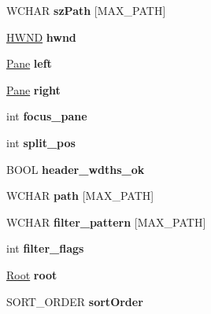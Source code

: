 \begin{DoxyCompactItemize}
W\+C\+H\+AR {\bfseries sz\+Path} \mbox{[}M\+A\+X\+\_\+\+P\+A\+TH\mbox{]}
\item 
\mbox{\label{struct_child_wnd_a444c32ec7347454b65c526836710901a}} 
\hyperlink{interfacevoid}{H\+W\+ND} {\bfseries hwnd}
\item 
\mbox{\label{struct_child_wnd_aa307df38d1d5c09e524b4961b20584c5}} 
\hyperlink{struct_pane}{Pane} {\bfseries left}
\item 
\mbox{\label{struct_child_wnd_ab77c5ad54ad448a44f1acb95eb2747ba}} 
\hyperlink{struct_pane}{Pane} {\bfseries right}
\item 
\mbox{\label{struct_child_wnd_aa809637819408feb62994253eb5d1c93}} 
int {\bfseries focus\+\_\+pane}
\item 
\mbox{\label{struct_child_wnd_a9394d7b181476a467ba306b6db6fbb9f}} 
int {\bfseries split\+\_\+pos}
\item 
\mbox{\label{struct_child_wnd_a696acfa7f9769a60a5082de040c8c574}} 
B\+O\+OL {\bfseries header\+\_\+wdths\+\_\+ok}
\item 
\mbox{\label{struct_child_wnd_afbcb5322841bc2e15d49b1e67a0843c4}} 
W\+C\+H\+AR {\bfseries path} \mbox{[}M\+A\+X\+\_\+\+P\+A\+TH\mbox{]}
\item 
\mbox{\label{struct_child_wnd_a25381c1b6326f52c3d70471a6b9a2fb1}} 
W\+C\+H\+AR {\bfseries filter\+\_\+pattern} \mbox{[}M\+A\+X\+\_\+\+P\+A\+TH\mbox{]}
\item 
\mbox{\label{struct_child_wnd_a5eac9e22c2a2617a2eb9a1336b772e2a}} 
int {\bfseries filter\+\_\+flags}
\item 
\mbox{\label{struct_child_wnd_a84e46288b224422998cd5d8e6ed54d3b}} 
\hyperlink{struct_root}{Root} {\bfseries root}
\item 
\mbox{\label{struct_child_wnd_adfc13861f2d050d71ed0000df696df20}} 
S\+O\+R\+T\+\_\+\+O\+R\+D\+ER {\bfseries sort\+Order}
\item 

\end{DoxyCompactItemize}

